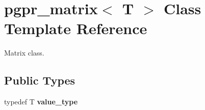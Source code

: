 \hypertarget{classpgpr__matrix}{\section{pgpr\+\_\+matrix$<$ T $>$ Class Template Reference}
\label{classpgpr__matrix}
}


Matrix class.  


\subsection*{Public Types}
\begin{DoxyCompactItemize}
\item 
\hypertarget{classpgpr__matrix_a5fd37a105951efdd380647fc006eaa5e}{typedef T {\bfseries value\+\_\+type}}\label{classpgpr__matrix_a5fd37a105951efdd380647fc006eaa5e}

\end{DoxyCompactItemize}

